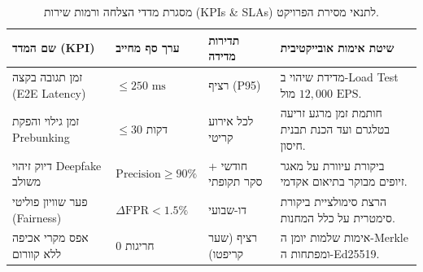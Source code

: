 \begin{table}[htbp]
    \centering
    \caption{מסגרת מדדי הצלחה ורמות שירות (\textenglish{KPIs \& SLAs}) לתנאי מסירת הפרויקט.}
    \label{tab:kpi}
    \begin{tabular}{p{} p{} p{} p{}}
        \hline
        \textbf{שם המדד (\textenglish{KPI})} & \textbf{ערך סף מחייב} & \textbf{תדירות מדידה} & \textbf{שיטת אימות אובייקטיבית} \\
        \hline
        זמן תגובה בקצה (\textenglish{E2E Latency}) & $\le 250\text{ ms}$ & רציף (\textenglish{P95}) & מדידת שיהוי ב-\textenglish{Load Test} מול $12,000\text{ EPS}$. \\
        זמן גילוי והפקת \textenglish{Prebunking} & $\le 30$ דקות & לכל אירוע קריטי & חותמת זמן מרגע זריעה בטלגרם ועד הכנת תבנית חיסון. \\
        דיוק זיהוי \textenglish{Deepfake} משולב & $\text{Precision} \ge 90\%$ & חודשי + סקר תקופתי & ביקורת עיוורת על מאגר זיופים מבוקר בתיאום אקדמי. \\
        פער שוויון פוליטי (\textenglish{Fairness}) & $\Delta\text{FPR} < 1.5\%$ & דו-שבועי & הרצת סימולציית ביקורת סימטרית על כלל המחנות. \\
        אפס מקרי אכיפה ללא קוורום & $0$ חריגות & רציף (שער קריפטו) & אימות שלמות יומן ה-\textenglish{Merkle} ומפתחות ה-\textenglish{Ed25519}. \\
        \hline
    \end{tabular}
\end{table}
